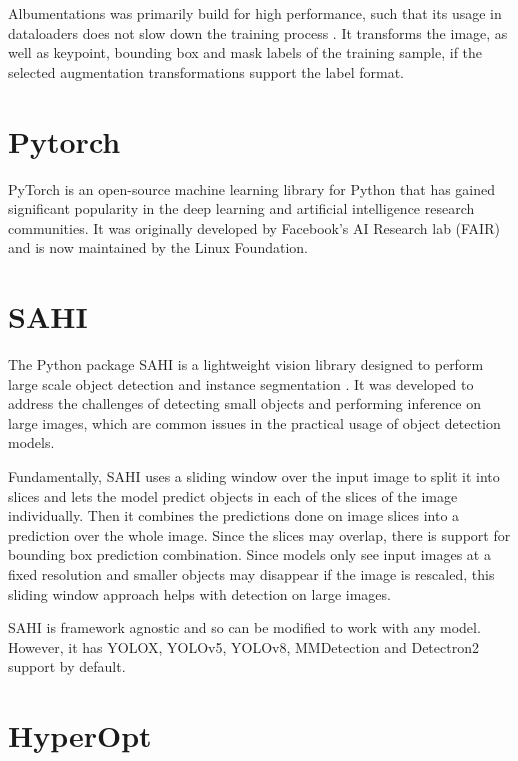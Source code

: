 \documentclass[10pt]{book}
\begin{document}
Albumentations was primarily build for high performance, such that its usage in dataloaders does not slow down the training process \cite{info11020125}. It transforms the image, as well as keypoint, bounding box and mask labels of the training sample, if the selected augmentation transformations support the label format. 

\section{Pytorch}

PyTorch is an open-source machine learning library for Python that has gained significant popularity in the deep learning and artificial intelligence research communities. It was originally developed by Facebook's AI Research lab (FAIR) and is now maintained by the Linux Foundation. %

\section{SAHI}

The Python package \ac{SAHI} is a lightweight vision library designed to perform large scale object detection and instance segmentation \cite{akyon2022sahi,obss2021sahi}. It was developed to address the challenges of detecting small objects and performing inference on large images, which are common issues in the practical usage of object detection models. 

Fundamentally, \ac{SAHI} uses a sliding window over the input image to split it into slices and lets the model predict objects in each of the slices of the image individually. Then it combines the predictions done on image slices into a prediction over the whole image. Since the slices may overlap, there is support for bounding box prediction combination. Since models only see input images at a fixed resolution and smaller objects may disappear if the image is rescaled, this sliding window approach helps with detection on large images. 

\ac{SAHI} is framework agnostic and so can be modified to work with any model. However, it has \ac{YOLO}X, \ac{YOLO}v5, \ac{YOLO}v8, MMDetection and Detectron2 support by default.

\section{HyperOpt}
\end{document}
